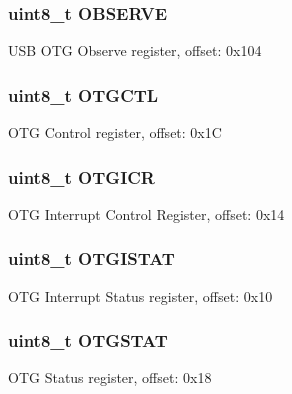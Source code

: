 \subsubsection[{O\+B\+S\+E\+R\+V\+E}]{\setlength{\rightskip}{0pt plus 5cm}uint8\+\_\+t O\+B\+S\+E\+R\+V\+E}\label{struct_u_s_b___mem_map_a4d4155ad45912de6f47166b4268fed6f}
U\+S\+B O\+T\+G Observe register, offset\+: 0x104 \hypertarget{struct_u_s_b___mem_map_a568c7325541772f0455c8bc732e10a61}{}
\subsubsection[{O\+T\+G\+C\+T\+L}]{\setlength{\rightskip}{0pt plus 5cm}uint8\+\_\+t O\+T\+G\+C\+T\+L}\label{struct_u_s_b___mem_map_a568c7325541772f0455c8bc732e10a61}
O\+T\+G Control register, offset\+: 0x1\+C \hypertarget{struct_u_s_b___mem_map_a377a3bd77416462f581c6f00f7abc263}{}
\subsubsection[{O\+T\+G\+I\+C\+R}]{\setlength{\rightskip}{0pt plus 5cm}uint8\+\_\+t O\+T\+G\+I\+C\+R}\label{struct_u_s_b___mem_map_a377a3bd77416462f581c6f00f7abc263}
O\+T\+G Interrupt Control Register, offset\+: 0x14 \hypertarget{struct_u_s_b___mem_map_a418c1814b43ee98065383e8270708b5e}{}
\subsubsection[{O\+T\+G\+I\+S\+T\+A\+T}]{\setlength{\rightskip}{0pt plus 5cm}uint8\+\_\+t O\+T\+G\+I\+S\+T\+A\+T}\label{struct_u_s_b___mem_map_a418c1814b43ee98065383e8270708b5e}
O\+T\+G Interrupt Status register, offset\+: 0x10 \hypertarget{struct_u_s_b___mem_map_a2100eaae4e423ee246bbbac4568423eb}{}
\subsubsection[{O\+T\+G\+S\+T\+A\+T}]{\setlength{\rightskip}{0pt plus 5cm}uint8\+\_\+t O\+T\+G\+S\+T\+A\+T}\label{struct_u_s_b___mem_map_a2100eaae4e423ee246bbbac4568423eb}
O\+T\+G Status register, offset\+: 0x18 \hypertarget{struct_u_s_b___mem_map_af90a61467080255b062e7a3ed7179e3a}{}
